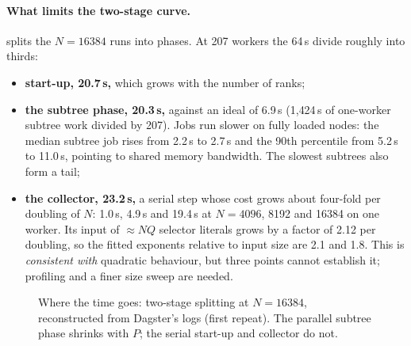 \documentclass[11pt,a4paper]{article}
\begin{document}
\paragraph{What limits the two-stage curve.}
 splits the $N=16384$ runs into phases. At 207 workers the 64\,s divide
roughly into thirds:
\begin{itemize}
\item \textbf{start-up, 20.7\,s,} which grows with the number of ranks;
\item \textbf{the subtree phase, 20.3\,s,} against an ideal of 6.9\,s (1{,}424\,s of
      one-worker subtree work divided by 207). Jobs run slower on fully loaded nodes:
      the median subtree job rises from 2.2\,s to 2.7\,s and the 90th percentile from
      5.2\,s to 11.0\,s, pointing to shared memory bandwidth. The slowest subtrees also
      form a tail;
\item \textbf{the collector, 23.2\,s,} a serial step whose cost grows about four-fold per
      doubling of $N$: 1.0\,s, 4.9\,s and 19.4\,s at $N=4096$, 8192 and 16384 on one
      worker. Its input of $\approx NQ$ selector literals grows by a factor of 2.12 per
      doubling, so the fitted exponents relative to input size are 2.1 and 1.8. This is
      \emph{consistent with} quadratic behaviour, but three points cannot establish it;
      profiling and a finer size sweep are needed.
\end{itemize}

\begin{figure}[htbp]
\centering
{}
\caption{Where the time goes: two-stage splitting at $N=16384$, reconstructed from Dagster's
logs (first repeat). The parallel subtree phase shrinks with $P$; the serial start-up and
collector do not.}
\label{fig:breakdown}
\end{figure}
\end{document}
